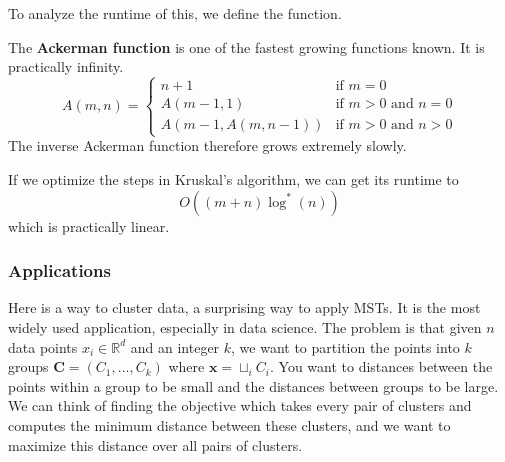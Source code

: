 \documentclass{article}
\begin{document}
      To analyze the runtime of this, we define the function. 

      \begin{definition}
        The \textbf{Ackerman function} is one of the fastest growing functions known. It is practically infinity. 
        \begin{equation}
          A(m,n) = 
          \begin{cases} 
            n+1 & \text{if } m = 0 \\
            A(m-1,1) & \text{if } m > 0 \text{ and } n = 0 \\
            A(m-1,A(m,n-1)) & \text{if } m > 0 \text{ and } n > 0
          \end{cases} 
        \end{equation}
        The inverse Ackerman function therefore grows extremely slowly. 
      \end{definition}

      If we optimize the steps in Kruskal's algorithm, we can get its runtime to 
      \begin{equation}
        O((m + n) \log^{\ast} (n))
      \end{equation}
      which is practically linear. 

    \subsubsection{Applications}

      Here is a way to cluster data, a surprising way to apply MSTs. It is the most widely used application, especially in data science. The problem is that given $n$ data points $x_i \in \mathbb{R}^d$ and an integer $k$, we want to partition the points into $k$ groups $\mathbf{C} = (C_1, \ldots, C_k)$ where $\mathbf{x} = \sqcup_i C_i$. You want to distances between the points within a group to be small and the distances between groups to be large. We can think of finding the objective which takes every pair of clusters and computes the minimum distance between these clusters, and we want to maximize this distance over all pairs of clusters.  
\end{document}
